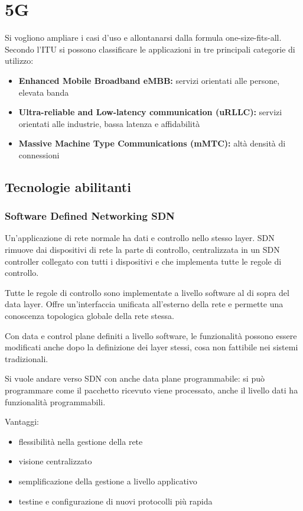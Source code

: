 \section{5G}

Si vogliono ampliare i casi d'uso e allontanarsi dalla formula one-size-fits-all. Secondo l'ITU si possono classificare le applicazioni in tre principali categorie di utilizzo: 
\begin{itemize}
    \item \textbf{Enhanced Mobile Broadband eMBB:} servizi orientati alle persone, elevata banda
    
    \item \textbf{Ultra-reliable and Low-latency communication (uRLLC):} servizi orientati alle industrie, bassa latenza e affidabilità
    
    \item \textbf{Massive Machine Type Communications (mMTC):} altà densità di connessioni
\end{itemize}

\subsection{Tecnologie abilitanti}

\subsubsection{Software Defined Networking SDN}

Un'applicazione di rete normale ha dati e controllo nello stesso layer. SDN rimuove dai dispositivi di rete la parte di controllo, centralizzata in un SDN controller collegato con tutti i dispositivi e che implementa tutte le regole di controllo.

Tutte le regole di controllo sono implementate a livello software al di sopra del data layer. Offre un'interfaccia unificata all'esterno della rete e permette una conoscenza topologica globale della rete stessa.

Con data e control plane definiti a livello software, le funzionalità possono essere modificati anche dopo la definizione dei layer stessi, cosa non fattibile nei sistemi tradizionali.

Si vuole andare verso SDN con anche data plane programmabile: si può programmare come il pacchetto ricevuto viene processato, anche il livello dati ha funzionalità programmabili.

Vantaggi:
\begin{itemize}
    \item flessibilità nella gestione della rete
    
    \item visione centralizzato
    
    \item semplificazione della gestione a livello applicativo 
    
    \item testine e configurazione di nuovi protocolli più rapida
\end{itemize}

